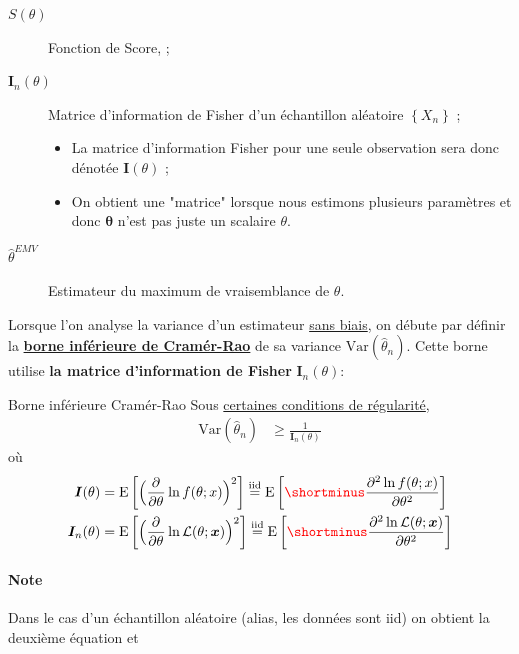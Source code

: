 \documentclass[10pt, french]{article}
\begin{document}
\begin{multicols*}{2}
\begin{distributions}[Notation]
\begin{description}
	\item[$S(\theta)$]	Fonction de Score,  ;
	\item[$\bm{I}_{n}(\theta)$]	Matrice d'information de Fisher d'un échantillon aléatoire $\left\{X_{n}\right\}$ ;
		\begin{itemize}
		\item	La matrice d'information Fisher pour une seule observation sera donc dénotée $\bm{I}(\theta)$ ;
		\item	On obtient une "matrice" lorsque nous estimons plusieurs paramètres et donc $\bm{\theta}$ n'est pas juste un scalaire $\theta$.
		\end{itemize}
	\item[$\hat{\theta}^{EMV}$]	Estimateur du maximum de vraisemblance de $\theta$.
\end{description}
\end{distributions}

Lorsque l'on analyse la variance d'un estimateur \underline{sans biais}, on débute par définir la \hyperlink{cramer-rao}{\textbf{borne inférieure de Cramér-Rao}} de sa variance $\text{Var}(\hat{\theta}_{n})$. Cette borne utilise \textbf{la matrice d'information de Fisher} $\bm{I}_{n}(\theta)$:

\begin{algo}{\hypertarget{cramer-rao}{Borne inférieure Cramér-Rao}}
Sous \hyperlink{reg_cond}{\color{blue!40!green!80!black}certaines conditions de régularité},
\begin{align*}
	\text{Var}(\hat{\theta}_{n}) 
	&\geq	\frac{1}{\bm{I}_{n}(\theta)}
\end{align*}
où
\begin{align*}
	\bm{I}(\theta) 
	&=	\text{E}\left[\Big(\deriv{\theta}{} \ln f(\theta; x)\Big)^{2}\right]	
	\overset{\text{iid}}{=}	\text{E}\left[{\color{red}\shortminus}\deriv[2]{\theta}{\ln f(\theta; x)}	\right]	\\
	\bm{I}_{n}(\theta) 
	&=	\text{E}\left[\Big(\deriv{\theta}{} \ln \mathcal{L}(\theta; \bm{x})\Big)^{2}\right]	
	\overset{\text{iid}}{=}	\text{E}\left[{\color{red}\shortminus}\deriv[2]{\theta}{\ln \mathcal{L}(\theta; \bm{x})}\right]	
\end{align*}
\paragraph{Note}	Dans le cas d'un échantillon aléatoire (alias, les données sont iid) on obtient la deuxième équation et 
\end{algo}


\end{multicols*}
\end{document}
